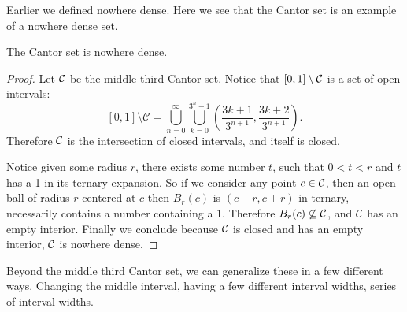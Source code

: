 Earlier we defined nowhere dense. Here we see that the Cantor set is an example of a nowhere dense set.  
\begin{claim}The Cantor set is nowhere dense.  
\end{claim}  
\begin{proof}
    Let $\mathcal{C}$ be the middle third Cantor set.  Notice that $[0,1]\setminus \mathcal{C}$ is a set of open intervals: 
    $$ [0,1] \setminus \mathcal{C} =\bigcup_{n=0}^\infty\bigcup_{k=0}^{3^n-1}\left(\frac{3k+1}{3^{n+1}},\frac{3k+2}{3^{n+1}}\right). $$
    Therefore $\mathcal{C}$ is the intersection of closed intervals, and itself is closed.  
    
    Notice given some radius $r$, there exists some number $t$, such that $0<t<r$ and $t$ has a 1 in its ternary expansion.  So if we consider any point $c \in \mathcal{C}$, then an open ball of radius $r$ centered at $c$ then $B_r(c)$ is $(c-r, c+r)$ in ternary, necessarily contains a number containing a $1$.  Therefore $B_r(c) \not\subseteq \mathcal{C}$, and $\mathcal{C}$ has an empty interior.  Finally we conclude because $\mathcal{C}$ is closed and has an empty interior, $\mathcal{C}$ is nowhere dense.      
\end{proof}
Beyond the middle third Cantor set, we can generalize these in a few different ways.  Changing the middle interval, having a few different interval widths, series of interval widths. 

